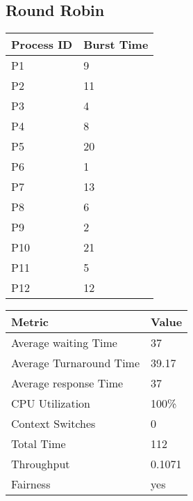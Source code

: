 \documentclass{article}
\begin{document}
\subsection{Round Robin}
\vspace{\baselineskip}
\hspace{1cm}
\begin{minipage}[t]{0.3\textwidth}
    \begin{tabularx}{\textwidth}{|l|X|}
    \hline
    \rowcolor{darkblue}
    \textbf{Process ID} & \textbf{Burst Time}\\
    \hline
    \rowcolor{lightblue}
    P1 & 9 \\
    P2 & 11 \\
    \rowcolor{lightblue}
    P3 & 4 \\
    P4 & 8 \\
    \rowcolor{lightblue}
    P5 & 20 \\
    P6 & 1 \\
    \rowcolor{lightblue}
    P7 & 13 \\
    P8 & 6 \\
    \rowcolor{lightblue}
    P9 & 2 \\
    P10 & 21 \\
    \rowcolor{lightblue}
    P11 & 5 \\
    P12 & 12 \\
     
    \hline
    \end{tabularx}
\end{minipage}
\hspace{2cm}
\begin{minipage}[t!]{0.35\textwidth}
    \begin{tabularx}{\textwidth}{|l|X|}
    \hline
    \rowcolor{darkblue}
    \textbf{Metric} & \textbf{Value} \\
    \hline
    \rowcolor{lightblue}
    Average waiting Time & 37 \\
    Average Turnaround Time & 39.17 \\
    \rowcolor{lightblue}
    Average response Time & 37 \\
    CPU Utilization & 100\% \\
    \rowcolor{lightblue}
    Context Switches & 0 \\
    Total Time & 112 \\
    \rowcolor{lightblue}
    Throughput & 0.1071 \\
    Fairness & yes \\
    \hline
    \end{tabularx}
\end{minipage}
\end{document}
